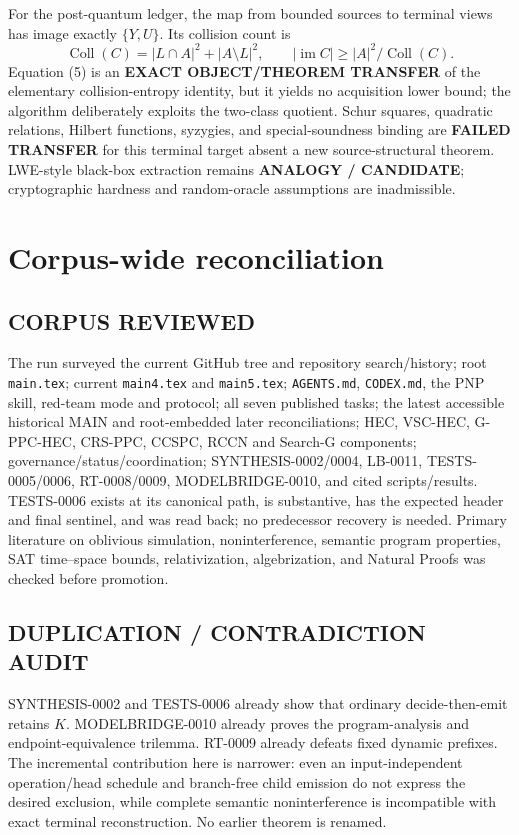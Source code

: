 \documentclass[11pt]{article}
\begin{document}
For the post-quantum ledger, the map from bounded sources to terminal views
has image exactly $\{Y,U\}$.  Its collision count is
\[
 \operatorname{Coll}(C)=|L\cap A|^2+|A\setminus L|^2,
 \qquad |\operatorname{im}C|\ge |A|^2/\operatorname{Coll}(C). \tag{5}
\]
Equation (5) is an \textbf{EXACT OBJECT/THEOREM TRANSFER} of the elementary
collision-entropy identity, but it yields no acquisition lower bound; the
algorithm deliberately exploits the two-class quotient.  Schur squares,
quadratic relations, Hilbert functions, syzygies, and special-soundness
binding are \textbf{FAILED TRANSFER} for this terminal target absent a new
source-structural theorem.  LWE-style black-box extraction remains
\textbf{ANALOGY / CANDIDATE}; cryptographic hardness and random-oracle
assumptions are inadmissible.

\section{Corpus-wide reconciliation}

\subsection*{CORPUS REVIEWED}
The run surveyed the current GitHub tree and repository search/history;
root \texttt{main.tex}; current \texttt{main4.tex} and \texttt{main5.tex};
\texttt{AGENTS.md}, \texttt{CODEX.md}, the PNP skill, red-team mode and
protocol; all seven published tasks; the latest accessible historical MAIN
and root-embedded later reconciliations; HEC, VSC-HEC, G-PPC-HEC, CRS-PPC,
CCSPC, RCCN and Search-G components; governance/status/coordination;
SYNTHESIS-0002/0004, LB-0011, TESTS-0005/0006, RT-0008/0009,
MODELBRIDGE-0010, and cited scripts/results.  TESTS-0006 exists at its
canonical path, is substantive, has the expected header and final sentinel,
and was read back; no predecessor recovery is needed.  Primary literature on
oblivious simulation, noninterference, semantic program properties, SAT
time--space bounds, relativization, algebrization, and Natural Proofs was
checked before promotion.

\subsection*{DUPLICATION / CONTRADICTION AUDIT}
SYNTHESIS-0002 and TESTS-0006 already show that ordinary decide-then-emit
retains $K$.  MODELBRIDGE-0010 already proves the program-analysis and
endpoint-equivalence trilemma.  RT-0009 already defeats fixed dynamic
prefixes.  The incremental contribution here is narrower: even an
input-independent operation/head schedule and branch-free child emission do
not express the desired exclusion, while complete semantic noninterference
is incompatible with exact terminal reconstruction.  No earlier theorem is
renamed.
\end{document}
